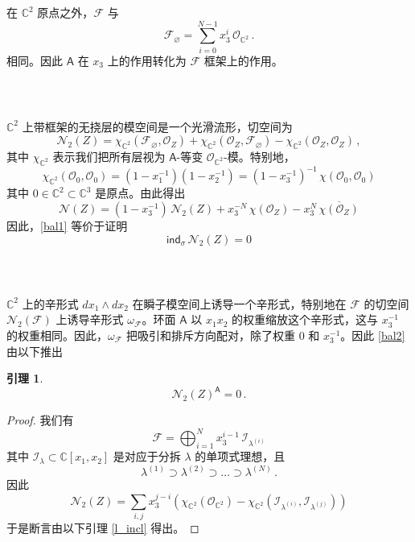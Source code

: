 \documentclass[12pt]{article}
\newcommand{\C}{\mathbb{C}}
\newcommand{\cO}{\mathscr{O}}
\newcommand{\cN}{\mathscr{N}}
\newcommand{\sind}{\mathsf{ind}}
\newcommand{\cF}{\mathscr{F}}
\newcommand{\cI}{\mathscr{I}}
\newcommand{\bA}{\mathsf{A}}
\newtheorem{Lemma}{引理}[section]
\theoremstyle{definition}
\begin{document}
在 $\C^2$ 原点之外，$\cF$ 与
$$
\cF_{\varnothing} = \sum_{i=0}^{N-1} x_3^i \, \cO_{\C^2}\,.
$$
相同。因此 $\bA$ 在 $x_3$ 上的作用转化为 $\cF$ 框架上的作用。

\subsubsection{\ }

$\C^2$ 上带框架的无挠层的模空间是一个光滑流形，切空间为
\begin{equation}
\cN_2(Z) = \chi_{\C^2}(\cF_{\varnothing},\cO_Z)
+  \chi_{\C^2}(\cO_Z,\cF_{\varnothing}) - \chi_{\C^2}(\cO_Z,\cO_Z) \,,
\label{Xi2F}
\end{equation}
其中 $\chi_{\C^2}$ 表示我们把所有层视为 $\bA$-等变 $\cO_{\C^2}$-模。特别地，
$$
\chi_{\C^2}(\cO_0,\cO_0) = (1 - x_1^{-1}) (1- x_2^{-1}) =
(1-x_3^{-1})^{-1}\, \chi(\cO_0,\cO_0)
$$
其中 $0\in \C^2\subset \C^3$ 是原点。由此得出
$$
\cN(Z) = (1-x_3^{-1}) \, \cN_2(Z) + x_3^{-N} \, \chi(\cO_Z) -
x_3^{N} \, \overline{\chi(\cO_Z)}
$$
因此，\eqref{bal1} 等价于证明
\begin{equation}
\sind_{\sigma} \, \cN_2(Z) = 0
\label{bal2}
\end{equation}

\subsubsection{\ }

$\C^2$ 上的辛形式 $dx_1 \wedge dx_2$ 在瞬子模空间上诱导一个辛形式，特别地在 $\cF$ 的切空间 $\cN_2(\cF)$ 上诱导辛形式 $\omega_{\cF}$。环面 $\bA$ 以 $x_1 x_2$ 的权重缩放这个辛形式，这与 $x_3^{-1}$ 的权重相同。因此，$\omega_{\cF}$ 把吸引和排斥方向配对，除了权重 $0$ 和 $x_3^{-1}$。因此 \eqref{bal2} 由以下推出

\begin{Lemma}
$$
\cN_2(Z)^{\bA} = 0\,.
$$
\end{Lemma}

\begin{proof}
我们有
$$
\cF = \bigoplus_{i=1}^N x_3^{i-1} \, \cI_{\lambda^{(i)}}
$$
其中 $\cI_{\lambda} \subset \C[x_1,x_2]$ 是对应于分拆 $\lambda$ 的单项式理想，且
$$
\lambda^{(1)} \supset \lambda^{(2)} \supset \dots \supset
\lambda^{(N)} \,.
$$
因此
$$
\cN_2(Z) = \sum_{i,j}
x_3^{j-i}\left(\chi_{\C^2}(\cO_{\C^2}) -
\chi_{\C^2}
\left(\cI_{\lambda^{(i)}},\cI_{\lambda^{(j)}}\right)
\right)
$$
于是断言由以下引理 \ref{l_incl} 得出。
\end{proof}

\subsubsection{\ }
\end{document}
